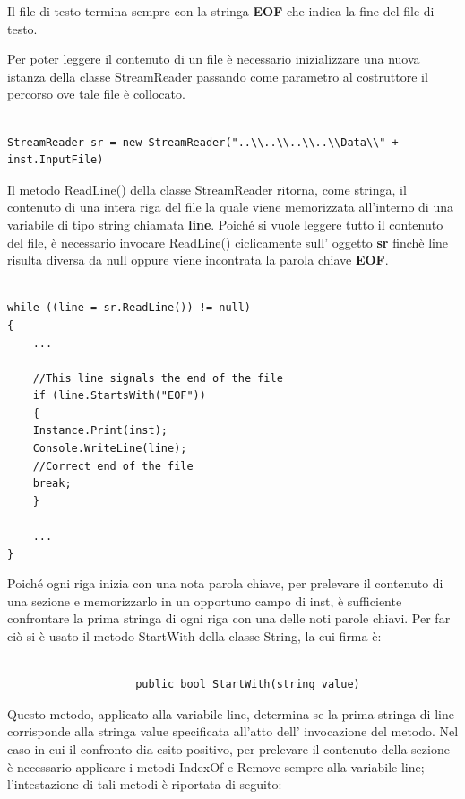 \documentclass[11pt]{article}
\begin{document}
Il file di testo termina sempre con la stringa \textbf{EOF} che indica la fine del file di testo.

Per poter leggere il contenuto di un file \`e necessario inizializzare una nuova istanza della classe StreamReader passando come parametro al costruttore il percorso ove tale file \`e  collocato.


\begin{lstlisting}

StreamReader sr = new StreamReader("..\\..\\..\\..\\Data\\" + inst.InputFile)

\end{lstlisting}


Il metodo ReadLine() della classe StreamReader ritorna, come stringa, il contenuto di una intera riga del file la quale viene memorizzata all'interno di una variabile di tipo string chiamata \textbf{line}. Poich\'e si vuole leggere tutto il contenuto del file, \`e necessario invocare ReadLine() ciclicamente sull' oggetto \textbf{sr} finch\`e line risulta diversa da null oppure viene incontrata la parola chiave \textbf{EOF}.

\begin{lstlisting}

while ((line = sr.ReadLine()) != null)
{
	...
	
	//This line signals the end of the file
	if (line.StartsWith("EOF"))
	{
	Instance.Print(inst);
	Console.WriteLine(line);
	//Correct end of the file
	break;
	}
	
	...
}
\end{lstlisting}


Poich\'e ogni riga inizia con una nota parola chiave, per prelevare il contenuto di una sezione e memorizzarlo in un opportuno campo di inst, \`e sufficiente confrontare la prima stringa di ogni riga con una delle noti parole chiavi. Per far ci\`o si \`e  usato il metodo StartWith della classe String, la cui firma \`e:

\begin{lstlisting}

                    public bool StartWith(string value)

\end{lstlisting}

Questo metodo, applicato alla variabile line, determina se la prima stringa di line corrisponde alla stringa value specificata all'atto dell' invocazione del metodo. Nel caso in cui il confronto dia esito positivo, per prelevare il contenuto della sezione \`e necessario applicare i metodi IndexOf e Remove sempre alla variabile line; l'intestazione di tali metodi \`e riportata di seguito:
\end{document}
